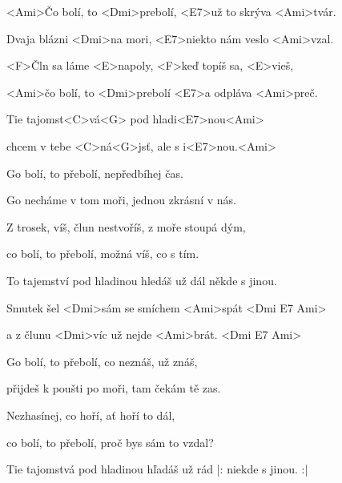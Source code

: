 

\zs
<Ami>Čo bolí, to <Dmi>prebolí, <E7>už to skrýva <Ami>tvár.

Dvaja blázni <Dmi>na mori, <E7>niekto nám veslo <Ami>vzal. 

<F>Čln sa láme <E>napoly, <F>keď topíš sa, <E>vieš, 

<Ami>čo bolí, to <Dmi>prebolí <E7>a odpláva <Ami>preč. 
\ks

\zr
Tie tajomst<C>vá<G> pod hladi<E7>nou<Ami>

chcem v tebe <C>ná<G>jsť, ale s i<E7>nou.<Ami> 
\kr

\zs
Go bolí, to přebolí, nepředbíhej čas.

Go necháme v tom moři, jednou zkrásní v nás. 

Z trosek, víš, člun nestvoříš, z moře stoupá dým, 

co bolí, to přebolí, možná víš, co s tím. 
\ks
 
\zr
To tajemství pod hladinou hledáš už dál někde s jinou. 
\kr
 
\hvezda
Smutek šel <Dmi>sám se smíchem <Ami>spát <Dmi E7 Ami>

a z člunu <Dmi>víc už nejde <Ami>brát. <Dmi E7 Ami>
\ks

\zs
Go bolí, to přebolí, co neznáš, už znáš, 

přijdeš k poušti po moři, tam čekám tě zas. 

Nezhasínej, co hoří, ať hoří to dál, 

co bolí, to přebolí, proč bys sám to vzdal? 
\ks

\zr
Tie tajomstvá pod hladinou hľadáš už rád |: niekde s jinou. :|
\kr

\kp
